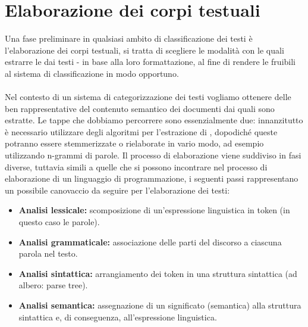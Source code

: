 \documentclass{article}
\theoremstyle{plain}
\theoremstyle{definition}
\begin{document}
\section{Elaborazione dei corpi testuali}
Una fase preliminare in qualsiasi ambito di classificazione dei testi è l'elaborazione dei corpi testuali, si tratta di scegliere le modalità con le quali estrarre le  dai testi - in base alla loro formattazione, al fine di rendere le  fruibili al sistema di classificazione in modo opportuno.
\\
\\
Nel contesto di un sistema di categorizzazione dei testi vogliamo ottenere delle  ben rappresentative del contenuto semantico dei documenti dai quali sono estratte. Le tappe che dobbiamo percorrere sono essenzialmente due: innanzitutto è necessario utilizzare degli algoritmi per l'estrazione di , dopodiché queste  potranno essere stemmerizzate o rielaborate in vario modo, ad esempio utilizzando n-grammi di parole. Il processo di elaborazione viene suddiviso in fasi diverse, tuttavia simili a quelle che si possono incontrare nel processo di elaborazione di un linguaggio di programmazione, i seguenti passi rappresentano un possibile canovaccio da seguire per l'elaborazione dei testi:

\begin{itemize}
\item \textbf{Analisi lessicale:} scomposizione di un'espressione linguistica in token (in questo caso le parole).
\item \textbf{Analisi grammaticale:} associazione delle parti del discorso a ciascuna parola nel testo.
\item \textbf{Analisi sintattica:} arrangiamento dei token in una struttura sintattica (ad albero: parse tree).
\item  \textbf{Analisi semantica:} assegnazione di un significato (semantica) alla struttura sintattica e, di conseguenza, all'espressione linguistica.
\end{itemize}
\end{document}
